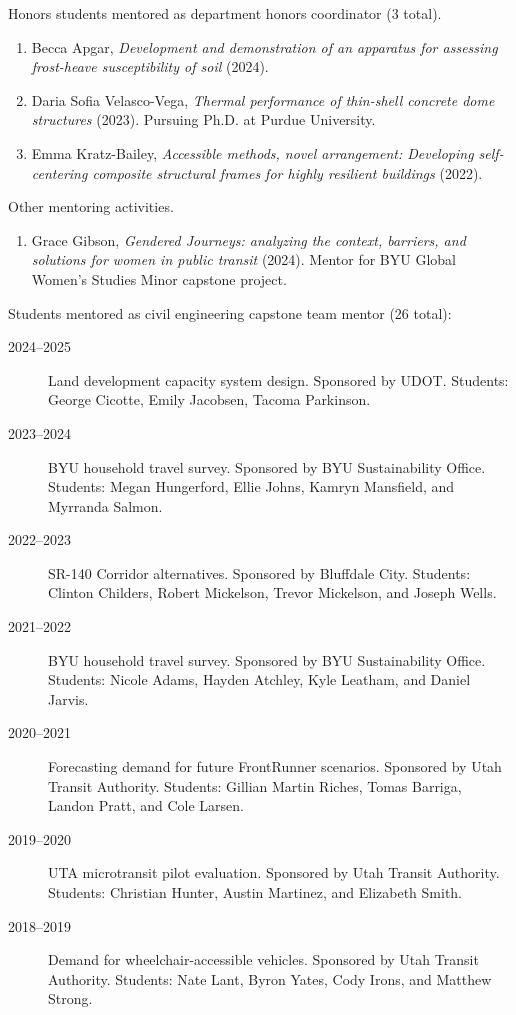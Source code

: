 \documentclass[margin,line]{res}
\newif\ifdetail{}
\newcounter{enuminitialize}
\newenvironment{myenum}[1][]
{%
 \setcounter{enuminitialize}{#1}
 \addtocounter{enuminitialize}{2}
 \begin{enumerate}[left= 4pt, itemsep=8pt, start=\value{enuminitialize}, label=\arabic*\addtocounter{enumi}{-2}]
}
{%
 \end{enumerate}
}
\begin{document}
\begin{resume}
Honors students mentored as department honors coordinator (3 total).
\vspace{0.2cm}
\begin{myenum}[3]
  \ifdetail {\color{NavyBlue} \fi
  \item Becca Apgar, \textit{Development and demonstration of an apparatus for assessing frost-heave susceptibility of soil} (2024).
  \item Daria Sofia Velasco-Vega, \textit{Thermal performance of thin-shell concrete dome structures} (2023). Pursuing Ph.D. at Purdue University.
  \item Emma Kratz-Bailey, \textit{Accessible methods, novel arrangement: Developing self-centering composite structural frames for highly resilient buildings} (2022).
  \ifdetail } \fi
\end{myenum}


Other mentoring activities.
\vspace{0.2cm}
\begin{myenum}[1]
  \ifdetail {\color{NavyBlue} \fi
  \item Grace Gibson, \textit{Gendered Journeys: analyzing the context, barriers, and solutions for women in public transit} (2024). Mentor for BYU Global Women's Studies Minor capstone project.
  \ifdetail } \fi
\end{myenum}



Students mentored as civil engineering capstone team mentor (26 total):
\vspace{0.2cm}
\begin{description}
  \ifdetail {\color{NavyBlue} \fi
  \item[2024--2025] Land development capacity system design. Sponsored by UDOT. Students: George Cicotte, Emily Jacobsen, Tacoma Parkinson.
  \item[2023--2024] BYU household travel survey. Sponsored by BYU Sustainability Office. Students: 
    Megan Hungerford, Ellie Johns, Kamryn Mansfield, and Myrranda Salmon.
  \item[2022--2023] SR-140 Corridor alternatives. Sponsored by Bluffdale City. Students:
    Clinton Childers, Robert Mickelson, Trevor Mickelson, and Joseph Wells.
  \item[2021--2022] BYU household travel survey. Sponsored by BYU Sustainability Office. Students: Nicole Adams, Hayden Atchley, Kyle Leatham, and Daniel Jarvis.
  \item[2020--2021] Forecasting demand for future FrontRunner scenarios. Sponsored by Utah Transit Authority. Students: Gillian Martin Riches, Tomas Barriga, Landon Pratt, and Cole Larsen.
  \ifdetail } \fi
  \item[2019--2020] UTA microtransit pilot evaluation. Sponsored by Utah Transit Authority. Students: Christian Hunter, Austin Martinez, and Elizabeth Smith.
  \item[2018--2019] Demand for wheelchair-accessible vehicles. Sponsored by Utah Transit Authority. Students: Nate Lant, Byron Yates, Cody Irons, and Matthew Strong.
\end{description}



\end{resume}
\end{document}
